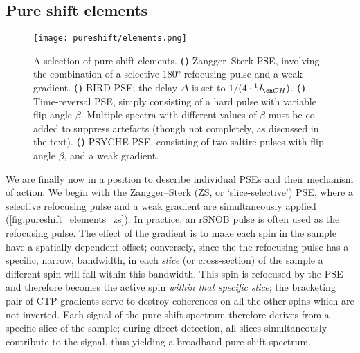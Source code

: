 \subsection{Pure shift elements}
\label{subsec:pureshift__elements}

\begin{figure}[htbp]
    \centering
    \texttt{[image: pureshift/elements.png]}
    {\label{fig:pureshift_elements_zs}}
    {\label{fig:pureshift_elements_bird}}
    {\label{fig:pureshift_elements_tr}}
    {\label{fig:pureshift_elements_psyche}}
    \caption[Pure shift elements]{
        A selection of pure shift elements.
        \textbf{()} Zangger--Sterk PSE\autocite{Zangger1997JMR}, involving the combination of a selective \ang{180} refocusing pulse and a weak gradient.
        \textbf{()} BIRD PSE\autocite{Garbow1982CPL,Aguilar2011ACIE}; the delay $\Delta$ is set to $1/(4 \cdot \oneJ{CH})$.
        \textbf{()} Time-reversal PSE\autocite{Sorensen1985JACS}, simply consisting of a hard pulse with variable flip angle $\beta$. Multiple spectra with different values of $\beta$ must be co-added to suppress artefacts (though not completely, as discussed in the text).
        \textbf{()} PSYCHE PSE\autocite{Foroozandeh2014ACIE}, consisting of two saltire pulses\autocite{Foroozandeh2018CEJ,Foroozandeh2020JMR} with flip angle $\beta$, and a weak gradient.
    }
    \label{fig:pureshift_elements}
\end{figure}

We are finally now in a position to describe individual PSEs and their mechanism of action.
We begin with the Zangger--Sterk (ZS, or `slice-selective') PSE\autocite{Zangger1997JMR}, where a selective refocusing pulse and a weak gradient are simultaneously applied (\cref{fig:pureshift_elements_zs}).
In practice, an rSNOB pulse\autocite{Kupce1995JMRSB} is often used as the refocusing pulse.
The effect of the gradient is to make each spin in the sample have a spatially dependent offset; conversely, since the the refocusing pulse has a specific, narrow, bandwidth, in each \textit{slice} (or cross-section) of the sample a different spin will fall within this bandwidth.
This spin is refocused by the PSE and therefore becomes the active spin \textit{within that specific slice}; the bracketing pair of CTP gradients serve to destroy coherences on all the other spins which are not inverted.
Each signal of the pure shift spectrum therefore derives from a specific slice of the sample; during direct detection, all slices simultaneously contribute to the signal, thus yielding a broadband pure shift spectrum.


